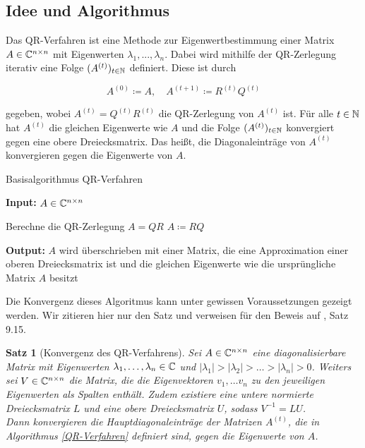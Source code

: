 \documentclass{article}
\theoremstyle{plain}
\newtheorem{theorem}    {Satz}   [section]
\begin{document}
\subsection{Idee und Algorithmus}

Das QR-Verfahren ist eine Methode zur Eigenwertbestimmung einer Matrix $A \in \mathbb{C}^{n \times n}$ mit Eigenwerten $\lambda_1, ..., \lambda_n$. Dabei wird mithilfe der QR-Zerlegung iterativ eine Folge $(A^{(t)})_{t \in \mathbb{N}}$ definiert. Diese ist durch

\begin{equation}
	A^{(0)} \coloneqq A, \quad A^{(t+1)} \coloneqq R^{(t)}Q^{(t)}
\end{equation}

gegeben, wobei $A^{(t)} = Q^{(t)} R^{(t)}$ die QR-Zerlegung von $A^{(t)}$ ist.
Für alle $t\in \mathbb{N}$ hat $A^{(t)}$ die gleichen Eigenwerte wie $A$ und die Folge $(A^{(t)})_{t \in \mathbb{N}}$ konvergiert gegen eine obere Dreiecksmatrix. Das heißt, die Diagonaleinträge von $A^{(t)}$ konvergieren gegen die Eigenwerte von $A$.

\renewcommand{\algorithmicrequire}{\textbf{Input:}}
\renewcommand{\algorithmicensure}{\textbf{Output:}}

\begin{algorithm}

	\caption{Basisalgorithmus QR-Verfahren}
	\label{QR-Verfahren}
	\algorithmicrequire{ $A \in \mathbb{C}^{n\times n}$}
	\begin{algorithmic}[1]
		\State Berechne die QR-Zerlegung $A = QR$
		\State $A \coloneqq RQ$
		\EndWhile
	\end{algorithmic}
	\algorithmicensure{ $A$ wird überschrieben mit einer Matrix, die eine Approximation einer oberen Dreiecksmatrix ist und die gleichen Eigenwerte wie die ursprüngliche Matrix $A$ besitzt}
\end{algorithm}


Die Konvergenz dieses Algoritmus kann unter gewissen Voraussetzungen gezeigt werden. Wir zitieren hier nur den Satz und verweisen für den Beweis auf \cite{Num}, Satz 9.15.

\begin{theorem}[Konvergenz des QR-Verfahrens]
	\label{Konv_QR}
	Sei $A \in \mathbb{C}^{n\times n}$ eine diagonalisierbare Matrix mit Eigenwerten $\lambda_1,\dots,\lambda_n \in \mathbb{C}$ und $|\lambda_1| > |\lambda_2| > \dots > |\lambda_n| > 0$. Weiters sei $V \in \mathbb{C}^{n \times n}$ die Matrix, die die Eigenvektoren $v_1,\dots v_n$ zu den jeweiligen Eigenwerten als Spalten enthält. Zudem existiere eine untere normierte Dreiecksmatrix $L$ und eine obere Dreiecksmatrix $U$, sodass $V^{-1} = LU$.\\
	Dann konvergieren die Hauptdiagonaleinträge der Matrizen $A^{(t)}$, die in Algorithmus \ref{QR-Verfahren} definiert sind, gegen die Eigenwerte von $A$.
\end{theorem}
\end{document}
